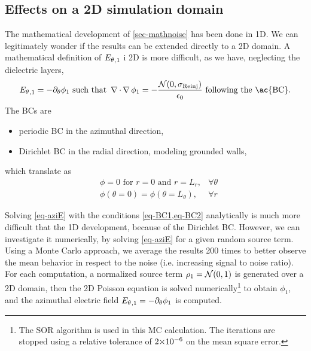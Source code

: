       
          
    \subsection{Effects on a \acs{2D} simulation domain}
      
      The mathematical development of \cref{sec-mathnoise} has been done in \ac{1D}.
      We can legitimately wonder if the results  can be extended directly to a \ac{2D} domain.
      A mathematical definition of ${E_{\theta}}_{, 1}$ i \ac{2D} is more difficult, as we have, neglecting the dielectric layers,
      \begin{equation} \label{eq-aziE}
        \aziE_{, 1} = -\partial_{\theta} \phi_1 \text{ such that } \grad \cdot \grad \phi_1 = - \frac { \N(0, \stdconv)}{\epsilon_0} \text{ following the \ac{BC}}.
      \end{equation}
      The \ac{BC}s are
      \begin{itemize}
        \item periodic \ac{BC} in the azimuthal direction,
        \item Dirichlet \ac{BC} in the radial direction, modeling grounded walls,
      \end{itemize}
      which translate as
      \begin{align}
        &\phi = 0 \text{ for } r=0 \text{ and } r=L_r, &\forall \theta \label{eq-BC1} \\
        &\phi(\theta = 0)= \phi(\theta = L_{\theta}) , &\forall r \label{eq-BC2}
      \end{align}
      
      Solving \cref{eq-aziE} with the conditions \cref{eq-BC1,eq-BC2} analytically is much more difficult that the \ac{1D} development, because of the Dirichlet \ac{BC}.
      However, we can investigate it numerically, by solving \cref{eq-aziE} for a given random source term.
      Using a Monte Carlo approach, we average the results  200 times to better observe the mean behavior in respect to the noise (i.e. increasing signal to noise ratio).
      For each computation, a normalized source term $\rho_1 = \mathcal{N}(0, 1)$ is generated over a \ac{2D} domain, then the \ac{2D} Poisson equation is solved numerically\footnote{The SOR algorithm is used in this MC calculation. The iterations are stopped using a relative tolerance of ${{2}{\times}10^{-6}}$ on the mean square error.} to obtain $\phi_1$, and the azimuthal electric field ${E_{\theta}}_{, 1} =- \partial_{\theta} \phi_1 $ is computed.
    
